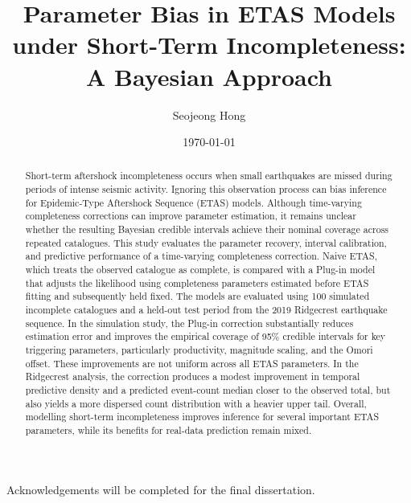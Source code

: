 \documentclass{statsmsc}
\title{Parameter Bias in ETAS Models under Short-Term Incompleteness:
A Bayesian Approach}
\author{Seojeong Hong}
\date{\today}
\begin{document}
\maketitle

\declarationdate{\today}
\declaration

\begin{acknowledgements}
Acknowledgements will be completed for the final dissertation.
\end{acknowledgements}

\clearpage
\tableofcontents
\clearpage

\mainmatter

\begin{abstract}
Short-term aftershock incompleteness occurs when small earthquakes are missed during periods of intense seismic activity. Ignoring this observation process can bias inference for Epidemic-Type Aftershock Sequence (ETAS) models.
Although time-varying completeness corrections can improve parameter estimation, it remains unclear whether the resulting Bayesian credible
intervals achieve their nominal coverage across repeated catalogues.
This study evaluates the parameter recovery, interval calibration, and
predictive performance of a time-varying completeness correction. Naive ETAS,
which treats the observed catalogue as complete, is compared with a Plug-in
model that adjusts the likelihood using completeness parameters estimated
before ETAS fitting and subsequently held fixed. The models are evaluated
using 100 simulated incomplete catalogues and a held-out test period from the
2019 Ridgecrest earthquake sequence.
In the simulation study, the Plug-in correction substantially reduces
estimation error and improves the empirical coverage of 95\% credible
intervals for key triggering parameters, particularly productivity, magnitude
scaling, and the Omori offset. These improvements are not uniform across all
ETAS parameters. In the Ridgecrest analysis, the correction produces a modest
improvement in temporal predictive density and a predicted event-count median
closer to the observed total, but also yields a more dispersed count
distribution with a heavier upper tail. Overall, modelling short-term
incompleteness improves inference for several important ETAS parameters, while
its benefits for real-data prediction remain mixed.
\end{abstract}
\end{document}
